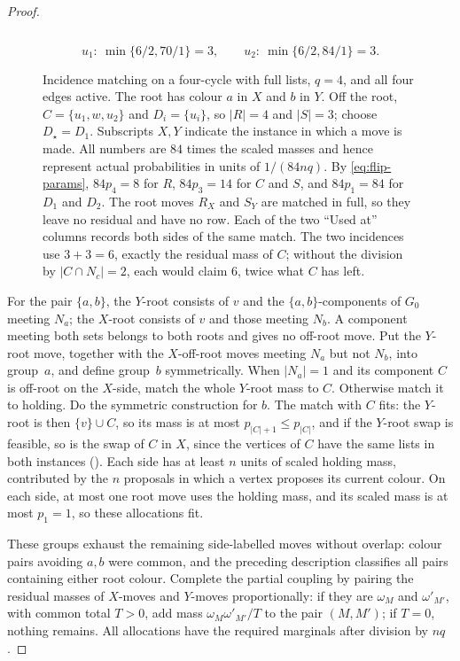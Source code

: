\documentclass[11pt,reqno]{article}
\theoremstyle{plain}
\theoremstyle{definition}
\theoremstyle{remark}
\theoremstyle{definition}
\theoremstyle{remark}
\begin{document}
\begin{proof}
\begin{figure}[tbp]
\begin{minipage}[t]{0.63\textwidth}
\begin{tabular}{@{}lrrrrr@{}}
\bottomrule
\end{tabular}
\[
  u_1:\ \min\{6/2,70/1\}=3,\qquad
  u_2:\ \min\{6/2,84/1\}=3.
\]
\end{minipage}
\caption{Incidence matching on a four-cycle with full lists, \(q=4\),
and all four edges active.  The root has colour \(a\) in \(X\) and \(b\)
in \(Y\).  Off the root,
\(C=\{u_1,w,u_2\}\) and \(D_i=\{u_i\}\), so \(|R|=4\) and \(|S|=3\);
choose \(D_\star=D_1\).  Subscripts \(X,Y\) indicate the instance in
which a move is made.
All numbers are \(84\) times the scaled masses and hence represent actual
probabilities in units of \(1/(84nq)\).  By \eqref{eq:flip-params},
\(84p_4=8\) for \(R\), \(84p_3=14\) for \(C\) and \(S\), and \(84p_1=84\)
for \(D_1\) and \(D_2\).  The root moves \(R_X\) and \(S_Y\) are matched in
full, so they leave no residual and have no row.
Each of the two ``Used at'' columns records both sides of the same match.
The two incidences use \(3+3=6\), exactly the residual mass of \(C\);
without the division by \(|C\cap N_c|=2\), each would claim \(6\), twice
what \(C\) has left.}
\label{fig:incidence-allocation}
\end{figure}

For the pair \(\{a,b\}\), the \(Y\)-root consists of \(v\) and the
\(\{a,b\}\)-components of \(G_0\) meeting \(N_a\); the \(X\)-root consists
of \(v\) and those meeting \(N_b\).  A component meeting both sets belongs
to both roots and gives no off-root move.  Put the \(Y\)-root move,
together with the \(X\)-off-root moves meeting \(N_a\) but not \(N_b\),
into group~\(a\), and define group~\(b\) symmetrically.  When \(|N_a|=1\) and its component \(C\)
is off-root on the \(X\)-side, match the whole \(Y\)-root mass to \(C\).
Otherwise match it to holding.  Do the symmetric construction for \(b\).
The match with \(C\) fits: the \(Y\)-root is then \(\{v\}\cup C\), so its
mass is at most \(p_{|C|+1}\le p_{|C|}\), and if the \(Y\)-root swap is
feasible, so is the swap of \(C\) in \(X\), since the vertices of \(C\)
have the same lists in both instances
().
Each side has at least \(n\) units of scaled holding mass, contributed by
the \(n\) proposals in which a vertex proposes its current colour.  On
each side, at most one root move uses the holding mass, and its scaled
mass is at most \(p_1=1\), so these allocations fit.

These groups exhaust the remaining side-labelled moves without overlap:
colour pairs avoiding \(a,b\) were common, and the preceding description
classifies all pairs containing either root colour.  Complete the partial
coupling by pairing the residual masses of \(X\)-moves and \(Y\)-moves
proportionally: if they are \(\omega_M\) and \(\omega'_{M'}\), with common
total \(T>0\), add mass \(\omega_M\omega'_{M'}/T\) to the pair \((M,M')\);
if \(T=0\), nothing remains.
All allocations have the required marginals after division by \(nq\).


\end{proof}
\end{document}
